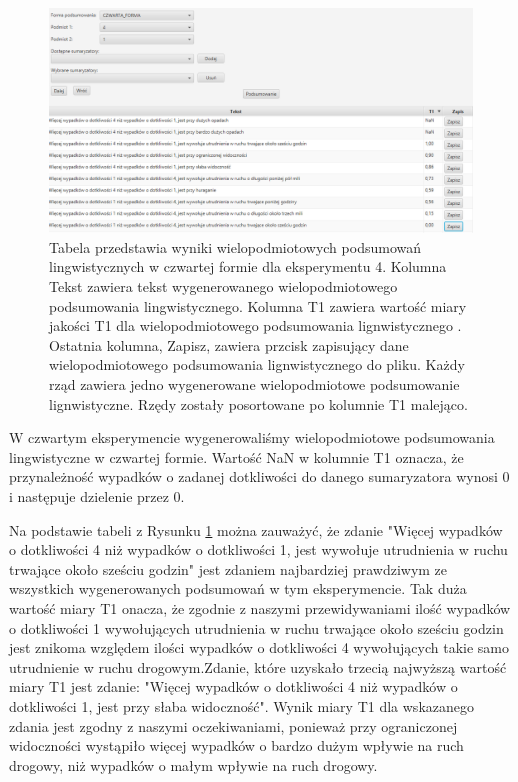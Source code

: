 \documentclass{classrep}
\begin{document}
\begin{figure}[h!]
 \centering
 \includegraphics[width=15cm]{ex_wiel4.png}
 \vspace{-0.3cm}
 \caption{Tabela przedstawia wyniki wielopodmiotowych podsumowań lingwistycznych w czwartej formie dla eksperymentu 4. Kolumna Tekst zawiera tekst wygenerowanego wielopodmiotowego podsumowania lingwistycznego. Kolumna T1 zawiera wartość miary jakości T1 dla wielopodmiotowego podsumowania lignwistycznego \cite{niewiadomski19}. Ostatnia kolumna, Zapisz, zawiera przcisk zapisujący dane wielopodmiotowego podsumowania lignwistycznego do pliku. Każdy rząd zawiera jedno wygenerowane wielopodmiotowe podsumowanie lignwistyczne. Rzędy zostały posortowane po kolumnie T1 malejąco.  }
 \label{wykr_ex_wiel4}
\end{figure}


W czwartym eksperymencie wygenerowaliśmy wielopodmiotowe podsumowania lingwistyczne w czwartej formie. Wartość NaN w kolumnie T1 oznacza, że przynależność wypadków o zadanej dotkliwości do danego sumaryzatora wynosi 0 i następuje dzielenie przez 0. 

Na podstawie tabeli z Rysunku \ref{wykr_ex_wiel4} można zauważyć, że zdanie "Więcej wypadków o dotkliwości 4 niż wypadków o dotkliwości 1, jest wywołuje utrudnienia w ruchu trwające około sześciu godzin" jest zdaniem najbardziej prawdziwym ze wszystkich wygenerowanych podsumowań w tym eksperymencie. Tak duża wartość miary T1 onacza, że zgodnie z naszymi przewidywaniami ilość wypadków o dotkliwości 1 wywołujących utrudnienia w ruchu trwające około sześciu godzin jest znikoma względem ilości wypadków o dotkliwości 4 wywołujących takie samo utrudnienie w ruchu drogowym.Zdanie, które uzyskało trzecią najwyższą wartość miary T1 jest zdanie: "Więcej wypadków o dotkliwości 4 niż wypadków o dotkliwości 1, jest przy słaba widoczność". Wynik miary T1 dla wskazanego zdania jest zgodny z naszymi oczekiwaniami, ponieważ przy ograniczonej widoczności wystąpiło więcej wypadków o bardzo dużym wpływie na ruch drogowy, niż wypadków o małym wpływie na ruch drogowy. 
\end{document}
